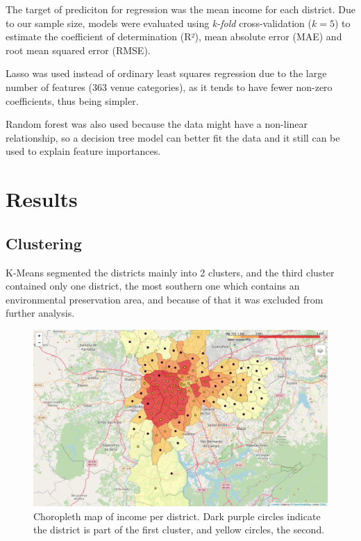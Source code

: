 \documentclass[12pt]{article}
\begin{document}
The target of prediciton for regression was the mean income for each district.
Due to our sample size, models were evaluated using \emph{k-fold}
cross-validation (\(k=5\)) to estimate the coefficient of determination (R²),
mean absolute error (MAE) and root mean squared error (RMSE).

Lasso was used instead of ordinary least squares regression due to the large
number of features (363 venue categories), as it tends to have fewer non-zero
coefficients, thus being simpler.

Random forest was also used because the data might have a non-linear
relationship, so a decision tree model can better fit the data and it still can
be used to explain feature importances.



\section{Results}

\subsection{Clustering}

K-Means segmented the districts mainly into 2 clusters, and the third cluster
contained only one district, the most southern one which contains an
environmental preservation area, and because of that it was excluded from
further analysis.

\begin{figure}[h]
        \centering
        \includegraphics[width=\linewidth]{map_cluster_labels.png}
        \caption{Choropleth map of income per district. Dark purple circles
        indicate the district is part of the first cluster, and yellow circles,
        the second.\label{fig:map_cluster_labels}}
\end{figure}
\end{document}
